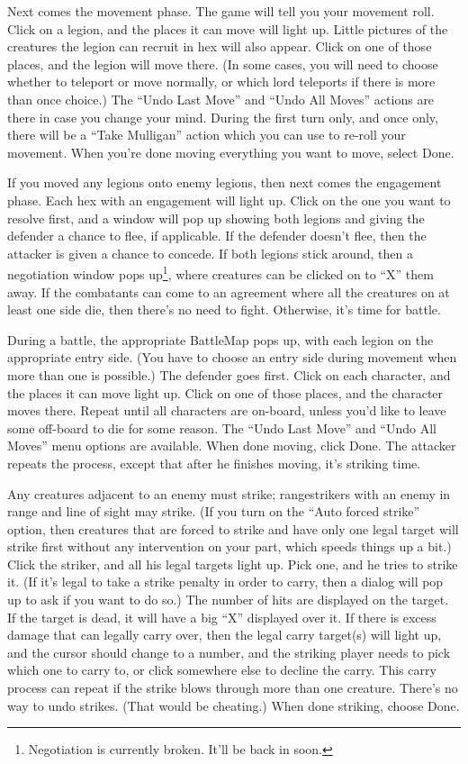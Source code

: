 \documentclass{article}
\begin{document}
Next comes the movement phase. The game will tell you your movement roll.
Click on a legion, and the places it can move will light up. Little pictures
of the creatures the legion can recruit in hex will also appear. Click on 
one of those places, and the legion will move there. (In some cases, you 
will need to choose whether to teleport or move normally, or which lord 
teleports if there is more than once choice.) The ``Undo Last Move'' and
``Undo All Moves'' actions are there in case you change your mind. During the
first turn only, and once only, there will be a ``Take Mulligan'' action which
you can use to re-roll your movement. When you're done moving everything you
want to move, select Done.

If you moved any legions onto enemy legions, then next comes the engagement
phase. Each hex with an engagement will light up. Click on the one you want
to resolve first, and a window will pop up showing both legions and giving the
defender a chance to flee, if applicable. If the defender doesn't flee, then
the attacker is given a chance to concede. If both legions stick around, then
a negotiation window pops up\footnote{Negotiation is currently broken.
It'll be back in soon.}, where creatures can be clicked on to ``X'' them
away. If the combatants can come to an agreement where all the creatures on
at least one side die, then there's no need to fight. Otherwise, it's time
for battle.

During a battle, the appropriate BattleMap pops up, with each legion on the
appropriate entry side. (You have to choose an entry side during movement
when more than one is possible.) The defender goes first. Click on each
character, and the places it can move light up. Click on one of those
places, and the character moves there. Repeat until all characters are
on-board, unless you'd like to leave some off-board to die for some reason.
The ``Undo Last Move'' and ``Undo All Moves'' menu options are available. When
done moving, click Done. The attacker repeats the process, except that 
after he finishes moving, it's striking time.

Any creatures adjacent to an enemy must strike; rangestrikers with an enemy in
range and line of sight may strike. (If you turn on the ``Auto forced strike''
option, then creatures that are forced to strike and have only one legal
target will strike first without any intervention on your part, which speeds
things up a bit.) Click the striker, and all his legal targets light up. 
Pick one, and he tries to strike it. (If it's legal to take a strike penalty 
in order to carry, then a dialog will pop up to ask if you want to do so.) 
The number of hits are displayed on the target. If the target is dead, it 
will have a big ``X'' displayed over it. If there is excess damage that can 
legally carry over, then the legal carry target(s) will light up, and the
cursor should change to a number, and the striking player needs to pick 
which one to carry to, or click somewhere else to decline the carry. This 
carry process can repeat if the strike blows through more than one creature. 
There's no way to undo strikes. (That would be cheating.) When done 
striking, choose Done. 
\end{document}
